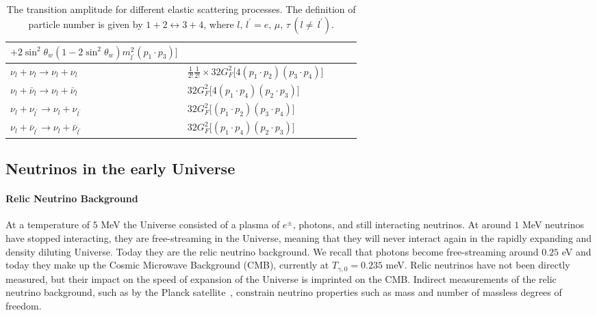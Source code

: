 \begin{table}[ht]
\begin{tabular}{lp{8cm}lp{8cm}l}
   $+2\sin^2\theta_w\left(1-2\sin^2\theta_w\right)m^2_{l^\prime}\left(p_1\cdot p_3\right)\bigg]$ \\
\hline
$\nu_l+\nu_l\longrightarrow\nu_l+\nu_l$ &
$\frac{1}{2!}\frac{1}{2!}\times32G^2_F\bigg[4\left(p_1\cdot p_2\right)\left(p_3\cdot p_4\right)\bigg]$ \\
\hline
$\nu_l+\bar{\nu}_l\longrightarrow\nu_l+\bar{\nu}_l$ &
$32G^2_F\bigg[4\left(p_1\cdot p_4\right)\left(p_2\cdot p_3\right)\bigg]$ \\
\hline
$\nu_l+\nu_{l^\prime}\longrightarrow\nu_l+\nu_{l^\prime}$ &
$32G^2_F\bigg[\left(p_1\cdot p_2\right)\left(p_3\cdot p_4\right)\bigg]$ \\
\hline
$\nu_l+\bar{\nu}_{l^\prime}\longrightarrow\nu_l+\bar{\nu}_{l^\prime}$ &
$32G^2_F\bigg[\left(p_1\cdot p_4\right)\left(p_2\cdot p_3\right)\bigg]$ \\
\hline\hline
\end{tabular}
\caption{The transition amplitude for different elastic scattering processes. The definition of particle number is given by $1+2\leftrightarrow3+4$, where $l,\,l^\prime=e,\,\mu,\,\tau\,(l\neq\,l^\prime)$.}
\label{T006}
\end{table}

\clearpage


\subsection{Neutrinos in the early Universe }

\paragraph{Relic Neutrino Background}
At a temperature of $5$ MeV the Universe consisted of a plasma of $e^\pm$, photons, and still interacting neutrinos. At around $1$ MeV neutrinos have stopped interacting, they are free-streaming in the Universe, meaning that they will never interact again in the rapidly expanding and density diluting Universe.  Today they are the relic neutrino background. We recall that photons become free-streaming around $0.25$ eV and today they make up the Cosmic Microwave Background (CMB), currently at $T_{\gamma,0}=0.235$ meV. Relic neutrinos have not been directly measured, but their impact on the speed of expansion of the Universe is imprinted on the CMB. Indirect measurements of the relic neutrino background, such as by the Planck satellite~\cite{Planck:2018vyg,Planck:2015fie,Planck:2013pxb}, constrain neutrino properties such as mass and number of massless degrees of freedom.


